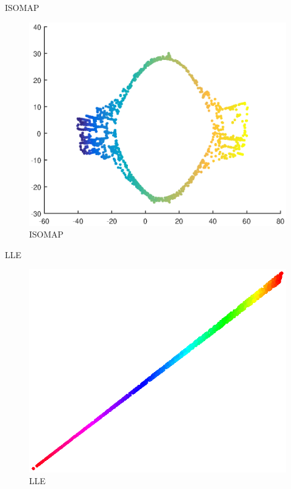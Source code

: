 \documentclass{beamer}
\begin{document}
\begin{darkframes}
   \begin{frame}{ISOMAP}
   \begin{figure}
   \centering
   \includegraphics[scale=0.5]{./figs/isomap.eps}
   \caption{ISOMAP}
   \end{figure}
   \end{frame}   
   
   \begin{frame}{LLE}
   \begin{figure}
   \centering
   \includegraphics[scale=0.5]{./figs/lle2.eps}
   \caption{LLE}
   \end{figure}
   \end{frame}
   

\end{darkframes}
\end{document}
